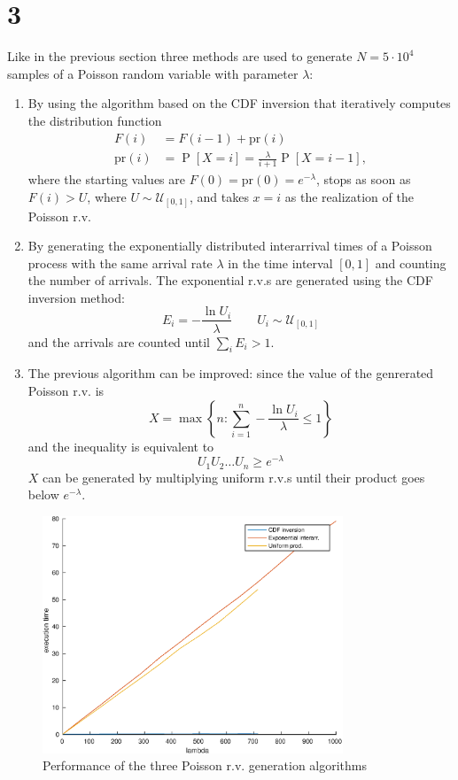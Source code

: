 \documentclass[a4paper,oneside]{article}
\newcommand{\Prob}[1]{\operatorname{P}\left[#1\right]}
\newcommand{\distr}[0]{\sim}
\newcommand{\unif}[1]{\mathcal{U}_{#1}}
\begin{document}
\section*{3}
Like in the previous section three methods are used to generate
$N=5\cdot10^4$ samples of a Poisson random variable with parameter
$\lambda$:
\begin{enumerate}
  \item By using the algorithm based on the CDF inversion that
  iteratively computes the distribution function
  \begin{align*}
    F(i) &= F(i-1) + \mathrm{pr}(i) \\
    \mathrm{pr}(i) &= \Prob{X = i} = \frac{\lambda}{i+1}\Prob{X = i-1} , 
  \end{align*}
  where the starting values are $F(0) = \mathrm{pr}(0) =
  e^{-\lambda}$, stops as soon as $F(i) > U$, where $U \distr
  \unif{[0,1]}$, and takes $x = i$ as the realization of the Poisson
  r.v.
  \item By generating the exponentially distributed interarrival times
    of a Poisson process with the same arrival rate $\lambda$ in the
    time interval $[0,1]$ and counting the number of arrivals. The
    exponential r.v.s are generated using the CDF inversion method:
    \[ E_i = -\frac{\ln U_i}{\lambda} \qquad U_i \distr \unif{[0,1]} \]
    and the arrivals are counted until $\sum_i E_i > 1$.
    \item The previous algorithm can be improved: since the value of
      the genrerated Poisson r.v. is
      \[ X = \max\left\{n: \sum_{i=1}^n -\frac{\ln U_i}{\lambda} \leq 1 \right\} \]
      and the inequality is equivalent to
      \[ U_1 U_2 \dots U_n \geq e^{-\lambda} \]
      $X$ can be generated by multiplying uniform r.v.s until their
      product goes below $e^{-\lambda}$.
\end{enumerate}
\begin{figure}[htbp]
  \centering
  \includegraphics[width=0.8\textwidth]{poisson_gen}
  \caption{Performance of the three Poisson r.v. generation algorithms}
  \label{plot:poisson}
\end{figure}
\end{document}
